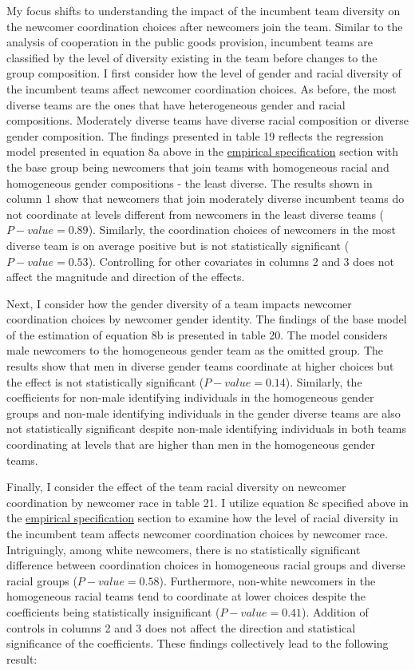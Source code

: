 \hspace  *{0mm} My focus shifts to understanding the impact of the incumbent team diversity on the newcomer coordination choices after newcomers join the team. Similar to the analysis of cooperation in the public goods provision, incumbent teams are classified by the level of diversity existing in the team before changes to the group composition. I first consider how the level of gender and racial diversity of the incumbent teams affect newcomer coordination choices. As before, the most diverse teams are the ones that have heterogeneous gender and racial compositions. Moderately diverse teams have diverse racial composition or diverse gender composition. The findings presented in table 19 reflects the regression model presented in equation 8a above in the \hyperref[subsec:Specification]{empirical specification} section with the base group being newcomers that join teams with homogeneous racial and homogeneous gender compositions - the least diverse. The results shown in column 1 show that newcomers that join moderately diverse incumbent teams do not coordinate at levels different from newcomers in the least diverse teams ($P-value=0.89$). Similarly, the coordination choices of newcomers in the most diverse team is on average positive but is not statistically significant ($P-value=0.53$). Controlling for other covariates in columns 2 and 3 does not affect the magnitude and direction of the effects. 

Next, I consider how the gender diversity of a team impacts newcomer coordination choices by newcomer gender identity. The findings of the base model of the estimation of equation 8b is presented in table 20. The model considers male newcomers to the homogeneous gender team as the omitted group. The results show that men in diverse gender teams coordinate at higher choices but the effect is not statistically significant ($P-value=0.14$). Similarly, the coefficients for non-male identifying individuals in the homogeneous gender groups and non-male identifying individuals in the gender diverse teams are also not statistically significant despite non-male identifying individuals in both teams coordinating at levels that are higher than men in the homogeneous gender teams. 

Finally, I consider the effect of the team racial diversity on newcomer coordination by newcomer race in table 21. I utilize equation 8c specified above in the \hyperref[subsec:Specification]{empirical specification} section to examine how the level of racial diversity in the incumbent team affects newcomer coordination choices by newcomer race. Intriguingly, among white newcomers, there is no statistically significant difference between coordination choices in homogeneous racial groups and diverse racial groups ($P-value=0.58$). Furthermore, non-white newcomers in the homogeneous racial teams tend to coordinate at lower choices despite the coefficients being statistically insignificant ($P-value=0.41$). Addition of controls in columns 2 and 3 does not affect the direction and statistical significance of the coefficients. These findings collectively lead to the following result:

